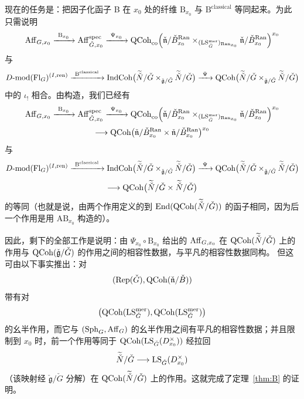 现在的任务是：把因子化函子 B 在 $x_0$ 处的纤维 $\mathrm{B}_{x_0}$ 与
$\mathrm{B}^{\mathrm{classical}}$ 等同起来。为此只需说明
\[
\mathrm{Aff}_{G,x_0}
\xrightarrow{\ \mathrm{B}_{x_0}\ }
\mathrm{Aff}^{\mathrm{spec}}_{\check G,x_0}
\xrightarrow{\ \Psi_{x_0}\ }
\mathrm{QCoh}_{\mathrm{co}}\Bigl(\check{\mathfrak{n}}/\check B^{\mathrm{Ran}}_{x_0}
\times_{(\mathrm{LS}^{\mathrm{mer}}_{\check G})_{\mathrm{Ran}_{x_0}}}
\check{\mathfrak{n}}/\check B^{\mathrm{Ran}}_{x_0}\Bigr)^{x_0}
\]
与
\[
D\text{-}\mathrm{mod}(\mathrm{Fl}_G)^{(I,\mathrm{ren})}
\xrightarrow{\ \mathrm{B}^{\mathrm{classical}}\ }
\mathrm{IndCoh}\bigl(\widetilde{\check N}/\check G
\times_{\check{\mathfrak{g}}/\check G}
\widetilde{\check N}/\check G\bigr)
\xrightarrow{\ \Psi\ }
\mathrm{QCoh}\bigl(\widetilde{\check N}/\check G
\times_{\check{\mathfrak{g}}/\check G}
\widetilde{\check N}/\check G\bigr)
\]
中的 $\iota_!$ 相合。由构造，我们已经有
\[
\mathrm{Aff}_{G,x_0}
\xrightarrow{\ \mathrm{B}_{x_0}\ }
\mathrm{Aff}^{\mathrm{spec}}_{\check G,x_0}
\xrightarrow{\ \Psi_{x_0}\ }
\mathrm{QCoh}_{\mathrm{co}}\Bigl(\check{\mathfrak{n}}/\check B^{\mathrm{Ran}}_{x_0}
\times_{(\mathrm{LS}^{\mathrm{mer}}_{\check G})_{\mathrm{Ran}_{x_0}}}
\check{\mathfrak{n}}/\check B^{\mathrm{Ran}}_{x_0}\Bigr)^{x_0}
\]
\begin{equation}
\longrightarrow
\mathrm{QCoh}\bigl(\check{\mathfrak{n}}/\check B^{\mathrm{Ran}}_{x_0}
\times \check{\mathfrak{n}}/\check B^{\mathrm{Ran}}_{x_0}\bigr)^{x_0}
\label{eq:3.3.6}
\end{equation}
与
\begin{equation}
D\text{-}\mathrm{mod}(\mathrm{Fl}_G)^{(I,\mathrm{ren})}
\xrightarrow{\ \mathrm{B}^{\mathrm{classical}}\ }
\mathrm{IndCoh}\bigl(\widetilde{\check N}/\check G
\times_{\check{\mathfrak{g}}/\check G}
\widetilde{\check N}/\check G\bigr)
\xrightarrow{\ \Psi\ }
\mathrm{QCoh}\bigl(\widetilde{\check N}/\check G
\times_{\check{\mathfrak{g}}/\check G}
\widetilde{\check N}/\check G\bigr)
\label{eq:3.3.7}
\end{equation}
\begin{equation}
\longrightarrow
\mathrm{QCoh}\bigl(\widetilde{\check N}/\check G\times
\widetilde{\check N}/\check G\bigr)
\label{eq:3.3.8}
\end{equation}
的等同（也就是说，由两个作用定义的到
$\operatorname{End}(\mathrm{QCoh}(\widetilde{\check N}/\check G))$ 的函子相同，因为后一个作用是用
$\mathrm{AB}_{x_0}$ 构造的）。

因此，剩下的全部工作是说明：由 $\Psi_{x_0}\circ \mathrm{B}_{x_0}$ 给出的
$\mathrm{Aff}_{G,x_0}$ 在 $\mathrm{QCoh}(\widetilde{\check N}/\check G)$ 上的作用与
$\mathrm{QCoh}(\check{\mathfrak{g}}/\check G)$ 的作用之间的相容性数据，与平凡的相容性数据同构。
但这可由以下事实推出：对
\[
(\mathrm{Rep}(\check G),\mathrm{QCoh}(\check{\mathfrak{n}}/\check B))
\]
带有对
\[
\bigl(\mathrm{QCoh}(\mathrm{LS}^{\mathrm{mer}}_{\check G}),\mathrm{QCoh}(\mathrm{LS}^{\mathrm{mer}}_{\check G})\bigr)
\]
的幺半作用，而它与 $(\mathrm{Sph}_G,\mathrm{Aff}_G)$ 的幺半作用之间有平凡的相容性数据；并且限制到
$x_0$ 时，前一个作用等同于 $\mathrm{QCoh}(\mathrm{LS}_{\check G}(D^\times_{x_0}))$ 经拉回
\[
\widetilde{\check N}/\check G\longrightarrow \mathrm{LS}_{\check G}(D^\times_{x_0})
\]
（该映射经 $\check{\mathfrak{g}}/\check G$ 分解）在 $\mathrm{QCoh}(\widetilde{\check N}/\check G)$
上的作用。这就完成了定理~\ref{thm:B} 的证明。
